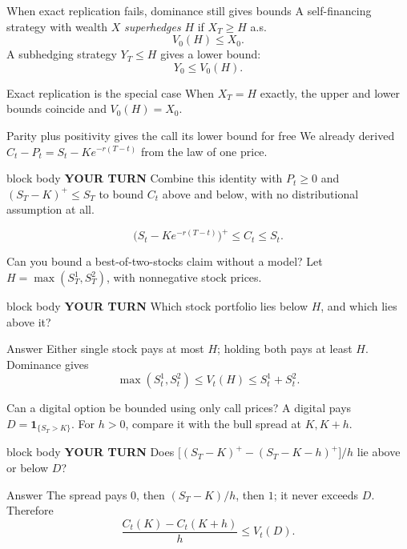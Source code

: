 \documentclass[handout,10pt,aspectratio=169]{beamer}
\newenvironment{pausebox}{\begin{beamercolorbox}[rounded=true,sep=0.8em,wd=\textwidth]{block body}
  \textbf{\color{CourseGold}YOUR TURN}\quad}{\end{beamercolorbox}}
\newcommand{\1}{\mathbf 1}
\begin{document}
\begin{frame}{When exact replication fails, dominance still gives bounds}
A self-financing strategy with wealth \(X\) \emph{superhedges} \(H\) if
\(X_T\geq H\) a.s.
\[
\boxed{V_0(H)\leq X_0.}
\]
A subhedging strategy \(Y_T\leq H\) gives a lower bound:
\[
\boxed{Y_0\leq V_0(H).}
\]
\begin{block}{Exact replication is the special case}
When \(X_T=H\) exactly, the upper and lower bounds coincide and
\(V_0(H)=X_0\).
\end{block}
\end{frame}

\begin{frame}{Parity plus positivity gives the call its lower bound for free}
We already derived \(C_t-P_t=S_t-Ke^{-r(T-t)}\) from the law of one price.
\begin{pausebox}
Combine this identity with \(P_t\geq0\) and \((S_T-K)^+\leq S_T\) to bound
\(C_t\) above and below, with no distributional assumption at all.
\end{pausebox}

\[
\boxed{
\bigl(S_t-Ke^{-r(T-t)}\bigr)^+\leq C_t\leq S_t.}
\]
\end{frame}

\begin{frame}{Can you bound a best-of-two-stocks claim without a model?}
Let \(H=\max(S_T^1,S_T^2)\), with nonnegative stock prices.
\begin{pausebox}
Which stock portfolio lies below \(H\), and which lies above it?
\end{pausebox}

\begin{exampleblock}{Answer}
Either single stock pays at most \(H\); holding both pays at least \(H\).
Dominance gives
\[
\boxed{\max(S_t^1,S_t^2)\leq V_t(H)\leq S_t^1+S_t^2.}
\]
\end{exampleblock}
\end{frame}



\begin{frame}{Can a digital option be bounded using only call prices?}
A digital pays \(D=\1_{\{S_T>K\}}\). For \(h>0\), compare it with the
bull spread at \(K,K+h\).
\begin{pausebox}
Does \(\bigl[(S_T-K)^+-(S_T-K-h)^+\bigr]/h\) lie above or below \(D\)?
\end{pausebox}

\begin{exampleblock}{Answer}
The spread pays \(0\), then \((S_T-K)/h\), then \(1\); it never exceeds
\(D\). Therefore
\[
\boxed{\frac{C_t(K)-C_t(K+h)}{h}\leq V_t(D).}
\]
\end{exampleblock}
\end{frame}
\end{document}
